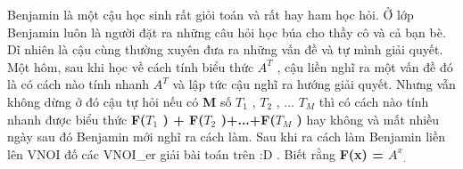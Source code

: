Benjamin là một cậu học sinh rất giỏi toán và rất hay ham học hỏi. Ở lớp Benjamin luôn là người đặt ra những câu hỏi học búa cho thầy cô và cả bạn bè. Dĩ nhiên là cậu cùng thường xuyên đưa ra những vấn đề và tự mình giải quyết. Một hôm, sau khi học về cách tính biểu thức   \textbf{    $A^{T}$}   , cậu liền nghĩ ra một vấn đề đó là có cách nào tính nhanh   \textbf{    $A^{T}$}   và lập tức cậu nghĩ ra hướng giải quyết. Nhưng vẫn không dừng ở đó cậu tự hỏi nếu có   \textbf{    M   }   số   \textbf{    $T_{1}$}   ,   \textbf{    $T_{2}$}   , ...   \textbf{    $T_{M}$}   thì có cách nào tính nhanh được biểu thức   \textbf{    F($T_{1}$    ) + F($T_{2}$    )+...+F($T_{M}$    )   }   hay không và mất nhiều ngày sau đó Benjamin mới nghĩ ra cách làm. Sau khi ra cách làm Benjamin liền lên VNOI đố các VNOI\_er giải bài toán trên :D . Biết rằng   \textbf{    F(x) = $A^{x}$}$_    .   $
